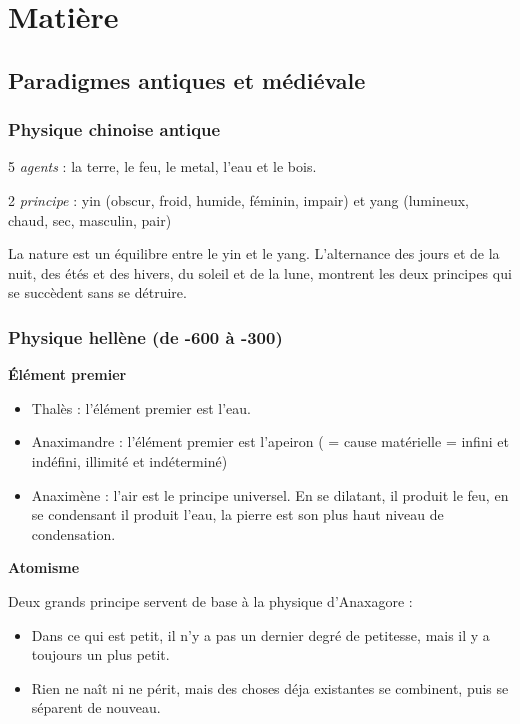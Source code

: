 \chapter{Matière}

\section{Paradigmes antiques et médiévale}

\begin{comment}
\end{comment}
\subsection{Physique chinoise antique}

\begin{center}
5 {\it agents} : la terre, le feu, le metal, l'eau et le bois.

2 {\it principe} : yin (obscur, froid, humide, féminin, impair) et yang (lumineux, chaud, sec, masculin, pair)
\end{center}

La nature est un équilibre entre le yin et le yang. L'alternance des jours et de la nuit, des étés et des hivers, du soleil et de la lune, montrent les deux principes qui se succèdent sans se détruire.

\subsection{Physique hellène (de -600 à -300)}

{\bf Élément premier}

\begin{itemize}[leftmargin=1cm, label=, itemsep=5pt]
\item Thalès : l'élément premier est l'eau.
\item Anaximandre : l'élément premier est l'apeiron ( = cause matérielle = infini et indéfini, illimité et indéterminé)
\item Anaximène : l'air est le principe universel. En se dilatant, il produit le feu, en se condensant il produit l'eau, la pierre est son plus haut niveau de condensation.
\end{itemize}

{\bf Atomisme}

Deux grands principe servent de base à la physique d'Anaxagore :

\begin{itemize}[leftmargin=1cm, label=, itemsep=5pt]
\item Dans ce qui est petit, il n'y a pas un dernier degré de petitesse, mais il y a toujours un plus petit.
\item Rien ne naît ni ne périt, mais des choses déja existantes se combinent, puis se séparent de nouveau.
\end{itemize}


